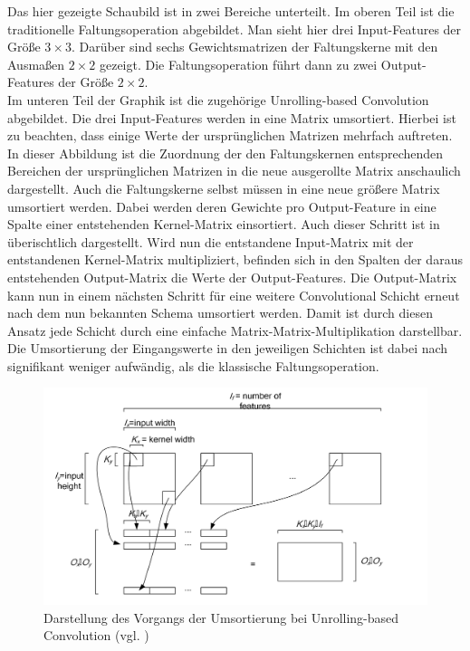 \documentclass[../main.tex]{subfiles}
\begin{document}
Das hier gezeigte Schaubild ist in zwei Bereiche unterteilt. Im oberen Teil ist die traditionelle Faltungsoperation abgebildet. Man sieht hier drei Input-Features der Größe $3\times 3$. Darüber sind sechs Gewichtsmatrizen der Faltungskerne mit den Ausmaßen $2\times 2$ gezeigt. Die Faltungsoperation führt dann zu zwei Output-Features der Größe $2\times2$. \\ Im unteren Teil der Graphik ist die zugehörige Unrolling-based Convolution abgebildet. Die drei Input-Features werden in eine Matrix umsortiert. Hierbei ist zu beachten, dass einige Werte der ursprünglichen Matrizen mehrfach auftreten. In dieser Abbildung ist die Zuordnung der den Faltungskernen entsprechenden Bereichen der ursprünglichen Matrizen in die neue ausgerollte Matrix anschaulich dargestellt. Auch die Faltungskerne selbst müssen in eine neue größere Matrix umsortiert werden. Dabei werden deren Gewichte pro Output-Feature in eine Spalte einer entstehenden Kernel-Matrix einsortiert. Auch dieser Schritt ist in  überischtlich dargestellt. Wird nun die entstandene Input-Matrix mit der entstandenen Kernel-Matrix multipliziert, befinden sich in den Spalten der daraus entstehenden Output-Matrix die Werte der Output-Features. Die Output-Matrix kann nun in einem nächsten Schritt für eine weitere Convolutional Schicht erneut nach dem nun bekannten Schema umsortiert werden. Damit ist durch diesen Ansatz jede Schicht durch eine einfache Matrix-Matrix-Multiplikation darstellbar. Die Umsortierung der Eingangswerte in den jeweiligen Schichten ist dabei nach \cite{UNROLLING_CONV} signifikant weniger aufwändig, als die klassische Faltungsoperation. \par 
\begin{figure}[!htbp]
	\centering
	\includegraphics[width=0.8\linewidth]{../images/Riedle/Unrolling_2.png}
	\caption{Darstellung des Vorgangs der Umsortierung bei Unrolling-based Convolution (vgl. \cite{UNROLLING_CONV})} \label{fig:cuda_unrolling_2}
\end{figure}
\end{document}
